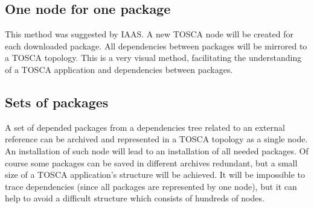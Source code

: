 \subsection*{One node for one package}
This method was suggested by IAAS. 
A new TOSCA node will be created for each downloaded package. 
All dependencies between packages will be mirrored to a TOSCA topology.
This is a very visual method, facilitating the understanding of a TOSCA application and dependencies between packages.

\subsection*{Sets of packages}
A set of depended packages from a dependencies tree related to an external reference can be archived and represented in a TOSCA topology as a single node.
An installation of such node will lead to an installation of all needed packages.
Of course some packages can be saved in different archives redundant, but a small size of a TOSCA application's structure will be achieved.
It will be impossible to trace dependencies (since all packages are represented by one node), but it can help to avoid a difficult structure which consists of hundreds of nodes. 

